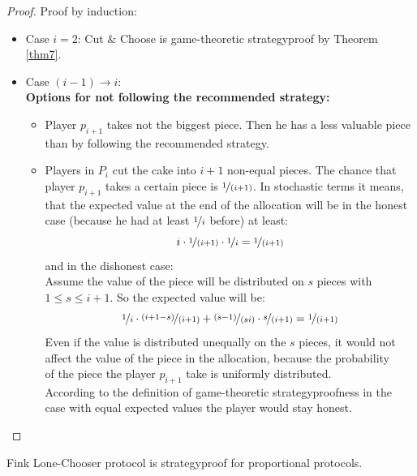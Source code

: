 \begin{proof} Proof by induction:
\textcolor{white}{x}
\begin{itemize} \item{Case} $i=2$: Cut $\&$ Choose is game-theoretic strategyproof by Theorem \ref{thm7}.\\
\item{Case} $(i-1) \rightarrow i$:\\ 
\newline
\textbf{Options for not following the recommended strategy:}\\
\begin{itemize}
\item Player $p_{i+1}$ takes not the biggest piece. Then he has a less valuable piece\\than by following the recommended strategy. 
\item Players in $P_i$ cut the cake into $i+1$ non-equal pieces. The chance that\\player $p_{i+1}$ takes a certain piece is $\nicefrac{1}{(i+1)}$. In stochastic terms it means,\\that the expected value at the end of the allocation will be in the honest\\case (because he had at least $\nicefrac{1}{i}$ before) at least: $$ i \cdot \nicefrac{1}{(i+1)} \cdot \nicefrac{1}{i} =\nicefrac{1}{(i+1)} $$ and in the dishonest case:\\
Assume the value of the piece will be distributed on $s$ pieces with\\$1 \leq s \leq i+1$. So the expected value will be: $$ \nicefrac{1}{i} \cdot \nicefrac{(i+1-s)}{(i+1)} + \nicefrac{(s-1)}{(si)}\cdot \nicefrac{s}{(i+1)} =\nicefrac{1}{(i+1)} $$ Even if the value is distributed unequally on the $s$ pieces, it would not\\affect the value of the piece in the allocation, because the probability\\of the piece the player $p_{i+1}$ take is uniformly distributed.\\
 \newpage According to the definition of game-theoretic strategyproofness in the\\case with equal expected values the player would stay honest.
\end{itemize}
\end{itemize}
\end{proof}
\begin{lem}
\label{lc2}
Fink Lone-Chooser protocol is strategyproof for proportional protocols.
\end{lem}
